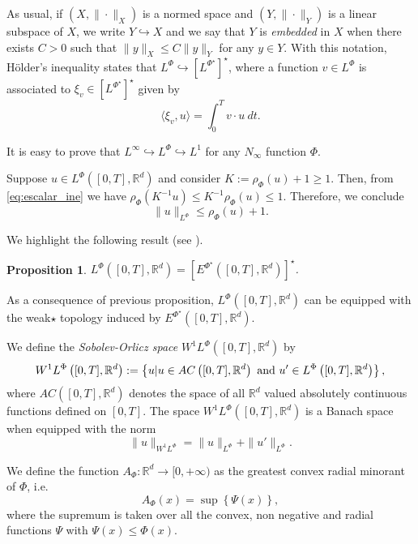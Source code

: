 \documentclass[twoside]{article}
\newtheorem{prop}[thm]{Proposition}
\theoremstyle{remark}
\newcommand{\orlnor}{\|_{L^{\Phi}}}
\newcommand{\lphi}{L^{\Phi}}
\newcommand{\lpsi}{L^{\Phi^{\star}}}
\newcommand{\wphi}{W^{1}\lphi}
\newcommand{\rr}{\mathbb{R}}
\renewcommand{\leq}{\leqslant}
\renewcommand{\geq}{\geqslant}
\newcommand{\epsi}{E^{\Phi^{\star}}}
\begin{document}
As usual, if $(X,\|\cdot\|_X)$ is a normed space and $(Y,\|\cdot \|_Y)$ is a linear subspace of $X$,  we write $Y\hookrightarrow X$ and we say that $Y$ is \emph{embedded} in $X$  when there exists $C>0$ such that
$\|y\|_X\leq C\|y\|_Y$ for any $y\in Y$.  With this notation, H\"older's inequality states that  $\lphi\hookrightarrow  \left[\lpsi\right]^\star$, where a function $v\in\lphi$ is associated  to $\xi_v\in \left[\lpsi\right]^\star$ given by
\begin{equation}\label{pairing}
  \langle \xi_v,u\rangle=\int_0^Tv\cdot u\ dt.
\end{equation}

It is easy to prove that $L^{\infty} \hookrightarrow L^\Phi\hookrightarrow L^1$ for any $N_{\infty}$ function $\Phi$.

Suppose $u\in\lphi([0,T],\rr^d)$ and consider $K:=\rho_{\Phi}(u)+1\geq 1$. Then, from \ref{eq:escalar_ine} we have $\rho_{\Phi}(K^{-1}u)\leq K^{-1}\rho_{\Phi}(u)\leq 1$. Therefore, we conclude 
\begin{equation}\label{eq:amemiya}
 \|u\orlnor \leq \rho_{\Phi}(u)+1.
\end{equation}



We highlight the following result (see \cite[Thm. 3.3]{gwiazda2013anisotropic}).

\begin{prop} $\lphi\left([0,T],\rr^d\right)=\left[\epsi\left([0,T],\rr^d\right)\right]^{\star}$.
 
\end{prop}


As a consequence of previous proposition,  $\lphi\left([0,T],\rr^d\right)$ can be equipped with the weak$\star$ topology induced by $\epsi\left([0,T],\rr^d\right)$.



We define the \emph{Sobolev-Orlicz space} $\wphi\left([0,T],\rr^d\right)$ by
\[\wphi\left([0,T],\rr^d\right):=\left\{u| u\in AC\left([0,T],\rr^d\right) \hbox{ and } u'\in \lphi\left([0,T],\rr^d\right)\right\},\]
where $AC\left([0,T],\rr^d\right)$ denotes the space of all $\rr^d$ valued absolutely continuous functions defined on $[0,T]$. The space $\wphi\left([0,T],\rr^d\right)$ is a Banach space when equipped with the norm
\begin{equation}\label{def-norma-orlicz-sob}
\|  u  \|_{\wphi}= \|  u  \|_{\lphi} + \|u'\orlnor.
\end{equation}


We define the function $A_{\Phi}:\rr^d\to [0,+\infty)$ as the greatest convex radial minorant of $\Phi$, i.e.
\begin{equation}\label{eq:inversa-gral}
A_{\Phi}(x)=\sup\left\{\Psi(x) \right\},
\end{equation}
where the supremum is taken over all the convex, non negative and radial functions $\Psi$ with $\Psi(x)\leq \Phi(x)$.
\end{document}
